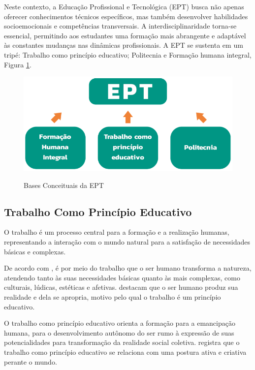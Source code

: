 Neste contexto, a Educação Profissional e Tecnológica (EPT) busca não apenas oferecer conhecimentos técnicos específicos, mas também desenvolver habilidades socioemocionais e competências transversais. A interdisciplinaridade torna-se essencial, permitindo aos estudantes uma formação mais abrangente e adaptável às constantes mudanças nas dinâmicas
profissionais. A EPT se sustenta em um tripé: Trabalho como princípio educativo; Politecnia e Formação humana integral, Figura \ref{fig:bases_ept}.

\begin{figure}[h!]
    \centering
    \caption{Bases Conceituais da EPT}
    \includegraphics[scale=0.4]{figuras/bases_ept_v.png}
    \label{fig:bases_ept}
\end{figure}




\subsection{Trabalho Como Princípio Educativo}
\label{trab_prin_edu}

O trabalho é um processo central para a formação e a realização humanas, representando a interação com o mundo natural para a satisfação de necessidades básicas e complexas.

De acordo com  , é por meio do trabalho que o ser humano transforma a natureza, atendendo tanto às suas necessidades básicas quanto às mais complexas, como culturais, lúdicas, estéticas e afetivas.  destacam que o ser humano produz sua realidade e dela se apropria, motivo pelo qual o trabalho é um princípio educativo.


O trabalho como princípio educativo orienta a formação para a emancipação humana, para o desenvolvimento autônomo do ser rumo à expressão de suas potencialidades para transformação da realidade social coletiva.  registra que o trabalho como princípio educativo se relaciona com uma postura ativa e criativa perante o mundo.








